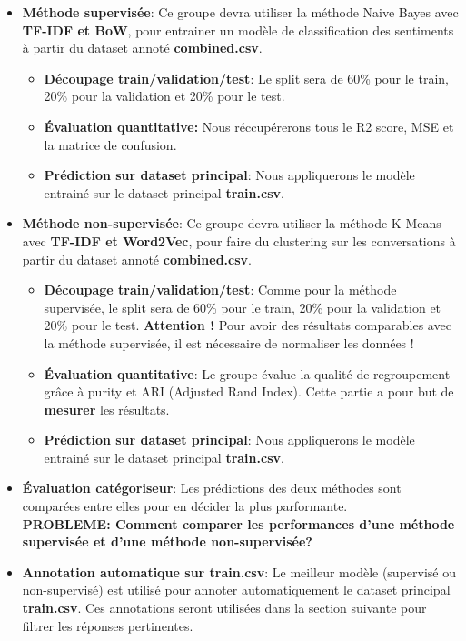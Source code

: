 \documentclass[12pt,a4paper]{article}
\begin{document}
\begin{itemize}
  \item \textbf{Méthode supervisée}: Ce groupe devra utiliser la méthode Naive Bayes avec \textbf{TF-IDF et BoW}, pour entrainer un modèle de classification des sentiments à partir du dataset annoté \textbf{combined.csv}. 
  \begin{itemize}
    \item \textbf{Découpage train/validation/test}: Le split sera de 60\% pour le train, 20\% pour la validation et 20\% pour le test. 
    \item \textbf{Évaluation quantitative:} Nous réccupérerons tous le R2 score, MSE et la matrice de confusion.
    \item \textbf{Prédiction sur dataset principal}: Nous appliquerons le modèle entrainé sur le dataset principal \textbf{train.csv}.  
  \end{itemize}
  \item \textbf{Méthode non-supervisée}: Ce groupe devra utiliser la méthode K-Means avec \textbf{TF-IDF et Word2Vec}, pour faire du clustering sur les conversations à partir du dataset annoté \textbf{combined.csv}.
  \begin{itemize}
    \item \textbf{Découpage train/validation/test}: Comme pour la méthode supervisée, le split sera de 60\% pour le train, 20\% pour la validation et 20\% pour le test. 
    \textbf{Attention !} Pour avoir des résultats comparables avec la méthode supervisée, il est nécessaire de normaliser les données !
    \item \textbf{Évaluation quantitative}: Le groupe évalue la qualité de regroupement grâce à purity et ARI (Adjusted Rand Index). Cette partie a pour but de \textbf{mesurer} les résultats.
    \item \textbf{Prédiction sur dataset principal}: Nous appliquerons le modèle entrainé sur le dataset principal \textbf{train.csv}.  
  \end{itemize}
  \item \textbf{Évaluation catégoriseur}: Les prédictions des deux méthodes sont comparées entre elles pour en décider la plus parformante.\\
  \textbf{PROBLEME: Comment comparer les performances d'une méthode supervisée et d'une méthode non-supervisée?}
  \item \textbf{Annotation automatique sur train.csv}: Le meilleur modèle (supervisé ou non-supervisé) est utilisé pour annoter automatiquement le dataset principal \textbf{train.csv}. Ces annotations seront utilisées dans la section suivante pour filtrer les réponses pertinentes.
\end{itemize}
\end{document}
